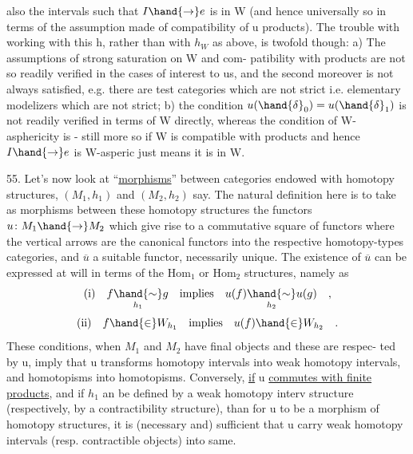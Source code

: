 also the intervals such that $I \hand{\to} e$ is  in W (and hence universally
so in terms of the assumption made of compatibility of u  products).
The trouble with  working with this h,  rather than with $h_W$ as above,
is twofold though:  a)  The assumptions of strong saturation on W and com-%
patibility with products  are not so readily verified in the cases
of interest to us,  and the second moreover is not always satisfied,  e.g.
there are test categories which are not strict i.e. elementary modelizers
which are not strict;  b)  the condition $u(\hand{\delta}_0) = u(\hand{\delta}_1)$  is not readily
verified in terms of W directly,  whereas the condition of W-asphericity
is  -  still more so if W is compatible with products and hence $I \hand{\to} e$ is
W-asperic just means it is in W.

55.     Let's now look at ``\uline{morphisms}'' between categories endowed with
homotopy structures,    $(M_1,h_1)$ and $(M_2,h_2)$ say.
The natural definition here is to take as morphisms between these homotopy
structures the functors   $u\colon M_1 \hand{\to} M_2$  which give rise to a commutative
square of functors
where the vertical arrows are the canonical functors into the respective
homotopy-types categories,  and $\overline{u}$  a suitable functor,  necessarily unique.
The existence of $\overline{u}$  can be expressed at will in terms of the $\mathrm{Hom}_1$ or $\mathrm{Hom}_2$
structures,  namely as
\[ \text{(i)}\quad f \underset{h_1}{\hand{\sim}} g \quad\text{implies}\quad u(f) \underset{h_2}{\hand{\sim}} u(g) \quad , \]
 
\[ \text{(ii)}\quad f \hand{\in} W_{h_1} \quad\text{implies}\quad u(f) \hand{\in} W_{h_2} \quad . \]
These conditions,  when $M_1$ and $M_2$ have final objects and these are respec-%
ted by u,  imply that u transforms  homotopy intervals into weak homotopy
intervals,  and homotopisms into homotopisms.  Conversely,  \uline{if} u \uline{commutes
with finite products},  and if $h_1$ an be defined by a weak homotopy interv
structure (respectively,  by a contractibility structure),  than for u to
be a morphism of homotopy structures,  it is (necessary and) sufficient
that u carry weak homotopy intervals (resp. contractible objects) into
same.


